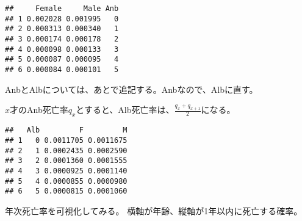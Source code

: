 \documentclass[
]{book}
\newenvironment{Shaded}{\begin{snugshade}}{\end{snugshade}}
\newcommand{\DataTypeTok}[1]{\textcolor[rgb]{0.13,0.29,0.53}{#1}}
\newcommand{\DecValTok}[1]{\textcolor[rgb]{0.00,0.00,0.81}{#1}}
\newcommand{\KeywordTok}[1]{\textcolor[rgb]{0.13,0.29,0.53}{\textbf{#1}}}
\newcommand{\NormalTok}[1]{#1}
\newcommand{\OperatorTok}[1]{\textcolor[rgb]{0.81,0.36,0.00}{\textbf{#1}}}
\newcommand{\StringTok}[1]{\textcolor[rgb]{0.31,0.60,0.02}{#1}}
\begin{document}
\begin{verbatim}
##     Female     Male Anb
## 1 0.002028 0.001995   0
## 2 0.000313 0.000340   1
## 3 0.000174 0.000178   2
## 4 0.000098 0.000133   3
## 5 0.000087 0.000095   4
## 6 0.000084 0.000101   5
\end{verbatim}

AnbとAlbについては、あとで追記する。Anbなので、Albに直す。

\(x\)才のAnb死亡率\(q_x\)とすると、Alb死亡率は、\(\frac{q_x+q_{x+1}}{2}\)になる。

\begin{Shaded}
\end{Shaded}

\begin{verbatim}
##   Alb         F         M
## 1   0 0.0011705 0.0011675
## 2   1 0.0002435 0.0002590
## 3   2 0.0001360 0.0001555
## 4   3 0.0000925 0.0001140
## 5   4 0.0000855 0.0000980
## 6   5 0.0000815 0.0001060
\end{verbatim}

年次死亡率を可視化してみる。
横軸が年齢、縦軸が1年以内に死亡する確率。
\end{document}
